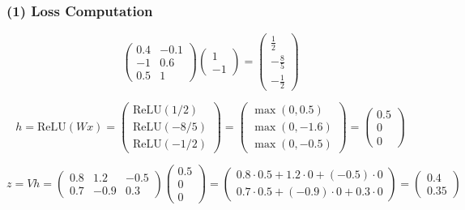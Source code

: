\documentclass[12pt]{ass1.cls}
\begin{document}
\subsubsection*{(1)  Loss Computation}


\[
\begin{pmatrix}
0.4 & -0.1 \\
-1 & 0.6 \\
0.5 & 1
\end{pmatrix}
\begin{pmatrix}
1 \\
-1
\end{pmatrix}
=
\begin{pmatrix}
\frac{1}{2} \\
-\frac{8}{5} \\
-\frac{1}{2}
\end{pmatrix}
\]

\[
h = \text{ReLU}(Wx) =
\begin{pmatrix}
\text{ReLU}(1/2) \\
\text{ReLU}(-8/5) \\
\text{ReLU}(-1/2)
\end{pmatrix}
=
\begin{pmatrix}
\max(0, 0.5) \\
\max(0, -1.6) \\
\max(0, -0.5)
\end{pmatrix}
=
\begin{pmatrix}
0.5 \\
0 \\
0
\end{pmatrix}
\]




\[
z = Vh = 
\begin{pmatrix}
0.8 & 1.2 & -0.5 \\
0.7 & -0.9 & 0.3
\end{pmatrix}
\begin{pmatrix}
0.5 \\
0 \\
0
\end{pmatrix}
=
\begin{pmatrix}
0.8 \cdot 0.5 + 1.2 \cdot 0 + (-0.5) \cdot 0 \\
0.7 \cdot 0.5 + (-0.9) \cdot 0 + 0.3 \cdot 0
\end{pmatrix}
=
\begin{pmatrix}
0.4 \\
0.35
\end{pmatrix}
\]
\end{document}
